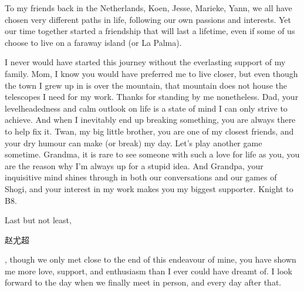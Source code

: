 \begin{acknowledgements}
To my friends back in the Netherlands, Koen, Jesse, Marieke, Yann, we all have chosen very different paths in life, following our own passions and interests. Yet our time together started a friendship that will last a lifetime, even if some of us choose to live on a faraway island (or La Palma).

I never would have started this journey without the everlasting support of my family. Mom, I know you would have preferred me to live closer, but even though the town I grew up in is over the mountain, that mountain does not house the telescopes I need for my work. Thanks for standing by me nonetheless. Dad, your levelheadedness and calm outlook on life is a state of mind I can only strive to achieve. And when I inevitably end up breaking something, you are always there to help fix it. Twan, my big little brother, you are one of my closest friends, and your dry humour can make (or break) my day. Let's play another game sometime. Grandma, it is rare to see someone with such a love for life as you, you are the reason why I'm always up for a stupid idea. And Grandpa, your inquisitive mind shines through in both our conversations and our games of Shogi, and your interest in my work makes you my biggest supporter. Knight to B8. %

Last but not least, \begin{CJK*}{UTF8}{gbsn}赵尤超\end{CJK*}, though we only met close to the end of this endeavour of mine, you have shown me more love, support, and enthusiasm than I ever could have dreamt of. I look forward to the day when we finally meet in person, and every day after that.

\end{acknowledgements}
